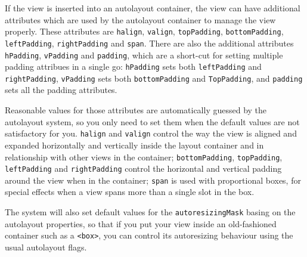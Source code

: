 If the view is inserted into an autolayout container, the view can
have additional attributes which are used by the autolayout container
to manage the view properly.  These attributes are \texttt{halign},
\texttt{valign}, \texttt{topPadding}, \texttt{bottomPadding},
\texttt{leftPadding}, \texttt{rightPadding} and \texttt{span}.  There
are also the additional attributes \texttt{hPadding},
\texttt{vPadding} and \texttt{padding}, which are a short-cut for
setting multiple padding attribues in a single go: \texttt{hPadding}
sets both \texttt{leftPadding} and \texttt{rightPadding},
\texttt{vPadding} sets both \texttt{bottomPadding} and
\texttt{TopPadding}, and \texttt{padding} sets all the padding
attributes.

Reasonable values for those attributes are automatically guessed by
the autolayout system, so you only need to set them when the default
values are not satisfactory for you.  \texttt{halign} and
\texttt{valign} control the way the view is aligned and expanded
horizontally and vertically inside the layout container and in
relationship with other views in the container;
\texttt{bottomPadding}, \texttt{topPadding}, \texttt{leftPadding} and
\texttt{rightPadding} control the horizontal and vertical padding
around the view when in the container; \texttt{span} is used with
proportional boxes, for special effects when a view spans more than a
single slot in the box.

The system will also set default values for the
\texttt{autoresizingMask} basing on the autolayout properties, so that
if you put your view inside an old-fashioned container such as a
\texttt{<box>}, you can control its autoresizing behaviour using the
usual autolayout flags.

